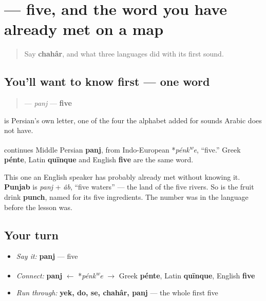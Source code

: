 \section[\texorpdfstring{\fa{پنج} (panj)}{پنج (panj)}]{ — five, and the word you have already met on a map}

\label{lesson:FA-C16-panj}



\begin{quote}
Say \textbf{chahâr}, and what three languages did with its first sound.
\end{quote}

\subsection*{You'll want to know first — one word}
\begin{quote}
\textbf{} — \emph{panj} — \textbf{five}
\end{quote}

\textbf{} is Persian's own letter, one of the four the alphabet added for sounds Arabic does not have.

\begin{cousinweb}
\textbf{} continues Middle Persian \textbf{panj}, from Indo-European *\emph{pénk\textsuperscript{w}e}, \textquotedblleft{}five.\textquotedblright{} Greek \textbf{pénte}, Latin \textbf{quīnque} and English \textbf{five} are the same word.

This one an English speaker has probably already met without knowing it. \textbf{Punjab} is \emph{panj} + \emph{âb}, \textquotedblleft{}five waters\textquotedblright{} — the land of the five rivers. So is the fruit drink \textbf{punch}, named for its five ingredients. The number was in the language before the lesson was.
\end{cousinweb}

\subsection*{Your turn}
\begin{itemize}
\raggedright
  \item \emph{Say it:} \textbf{panj} — five
  \item \emph{Connect:} \textbf{panj} $\leftarrow$ *\emph{pénk\textsuperscript{w}e} $\to$ Greek \textbf{pénte}, Latin \textbf{quīnque}, English \textbf{five}
  \item \emph{Run through:} \textbf{yek, do, se, chahâr, panj} — the whole first five
\end{itemize}

